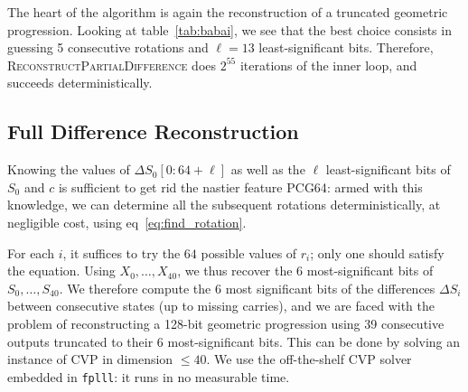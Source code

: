 \documentclass[preprint,svgnames]{iacrtrans}
\DeclareMathOperator{\LCG}{LCG}
\newcommand{\todo}[1]{\textcolor{red}{TODO:[#1]}}
\begin{document}
The heart of the algorithm is again the reconstruction of a truncated geometric
progression. Looking at table~\ref{tab:babai}, we see that the best choice
consists in guessing 5 consecutive rotations and $\ell=13$ least-significant
bits. Therefore, \textsc{ReconstructPartialDifference} does $2^{55}$ iterations
of the inner loop, and succeeds deterministically.




\subsection{Full Difference Reconstruction}

Knowing the values of $\Delta S_0[0:64+\ell]$ as well as the $\ell$
least-significant bits of $S_0$ and $c$ is sufficient to get rid the nastier
feature \textsf{PCG64}: armed with this knowledge, we can determine all the
subsequent rotations deterministically, at negligible cost, using
eq~\eqref{eq:find_rotation}.

For each $i$, it suffices to try the $64$ possible values of $r_i$; only one
should satisfy the equation. Using $X_0, \dots, X_{40}$, we thus recover the 6
most-significant bits of $S_0, \dots, S_{40}$. We therefore compute the 6 most
significant bits of the differences $\Delta S_i$ between consecutive states (up
to missing carries), and we are faced with the problem of reconstructing a
128-bit geometric progression using 39 consecutive outputs truncated to their 6
most-significant bits. This can be done by solving an instance of CVP in
dimension $\leq 40$. We use the off-the-shelf CVP solver embedded in
\texttt{fplll}: it runs in no measurable time.
\end{document}
